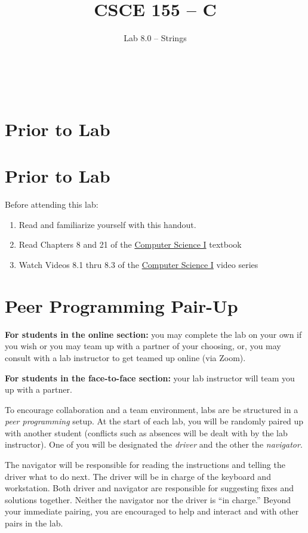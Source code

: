 \documentclass[12pt]{scrartcl}
\title{CSCE 155 -- C}
\subtitle{Lab 8.0 -- Strings}
\author{~}
\date{~}
\begin{document}
\maketitle

\section*{Prior to Lab}

\section*{Prior to Lab}

Before attending this lab:
\begin{enumerate}
  \item Read and familiarize yourself with this handout.
  \item Read Chapters 8 and 21 of the \href{http://cse.unl.edu/~cbourke/ComputerScienceOne.pdf}{Computer Science I} textbook
  \item Watch Videos 8.1 thru 8.3 of the \href{https://www.youtube.com/playlist?list=PL4IH6CVPpTZVkiEnCEOdGbYsFEdtKc5Bx}{Computer Science I} video series
\end{enumerate}

\section*{Peer Programming Pair-Up}

\textbf{For students in the online section:} you may complete
the lab on your own if you wish or you may team up with a partner
of your choosing, or, you may consult with a lab instructor to get
teamed up online (via Zoom).

\textbf{For students in the face-to-face section:} your
lab instructor will team you up with a partner.  

To encourage collaboration and a team environment, labs are be
structured in a \emph{peer programming} setup.  At the start of
each lab, you will be randomly paired up with another student 
(conflicts such as absences will be dealt with by the lab instructor).
One of you will be designated the \emph{driver} and the other
the \emph{navigator}.  

The navigator will be responsible for reading the instructions and
telling the driver what to do next.  The driver will be in charge of the
keyboard and workstation.  Both driver and navigator are responsible
for suggesting fixes and solutions together.  Neither the navigator
nor the driver is ``in charge.''  Beyond your immediate pairing, you
are encouraged to help and interact and with other pairs in the lab.
\end{document}
